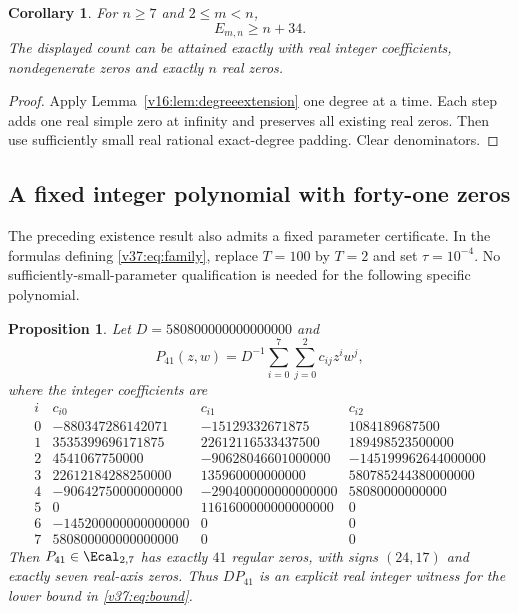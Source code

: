 \documentclass[UTF8,11pt]{ctexart}
\newtheorem{prop}[thm]{Proposition}
\newtheorem{cor}[thm]{Corollary}
\theoremstyle{definition}
\numberwithin{equation}{section}
\begin{document}
\begin{cor}\label{v37:cor:extension}
For $n\ge7$ and $2\le m<n$,
\[
                              E_{m,n}\ge n+34.
\]
The displayed count can be attained exactly with real integer
coefficients, nondegenerate zeros and exactly $n$ real zeros.
\end{cor}
\begin{proof}
Apply Lemma~\ref{v16:lem:degreeextension} one degree at a time.
Each step adds one real simple zero at infinity and preserves
all existing real zeros. Then use sufficiently small real
rational exact-degree padding. Clear denominators.
\end{proof}


\subsection{A fixed integer polynomial with forty-one zeros}
\label{v39:sec:fixed41}

The preceding existence result also admits a fixed parameter
certificate. In the formulas defining
\eqref{v37:eq:family}, replace $T=100$ by $T=2$ and set
$\tau=10^{-4}$. No sufficiently-small-parameter qualification
is needed for the following specific polynomial.

\begin{prop}\label{v39:prop:fixed41}
Let $D=580800000000000000$ and
\[
 P_{41}(z,w)=D^{-1}\sum_{i=0}^7\sum_{j=0}^2c_{ij}z^iw^j,
\]
where the integer coefficients are
{\small
\[
\begin{array}{c|rrr}
 i&c_{i0}&c_{i1}&c_{i2}\\ \hline
 0&-880347286142071&-15129332671875&1084189687500\\
 1&3535399696171875&22612116533437500&189498523500000\\
 2&4541067750000&-90628046601000000&-145199962644000000\\
 3&22612184288250000&135960000000000&580785244380000000\\
 4&-90642750000000000&-290400000000000000&58080000000000\\
 5&0&1161600000000000000&0\\
 6&-145200000000000000&0&0\\
 7&580800000000000000&0&0
\end{array}
\]
}
Then $P_{41}\in\Ecal_{2,7}$ has exactly $41$ regular zeros,
with signs $(24,17)$ and exactly seven real-axis zeros.
Thus $DP_{41}$ is an explicit real integer witness for
the lower bound in \eqref{v37:eq:bound}.
\end{prop}
\end{document}
